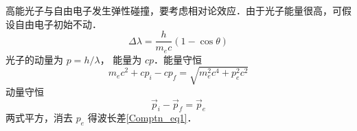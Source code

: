 

高能光子与自由电子发生弹性碰撞，要考虑相对论效应．由于光子能量很高，可假设自由电子初始不动．
\begin{equation}\label{Comptn_eq1}
\Delta \lambda  = \frac{h}{m_e c}(1 - \cos\theta )
\end{equation}
光子的动量为 $p = h/\lambda$， 能量为 $cp$．能量守恒
\begin{equation}
m_e c^2 + c p_i - c p_f = \sqrt{m_e^2 c^4 + p_e^2 c^2}
\end{equation}
动量守恒
\begin{equation}
\vec p_i - \vec p_f = \vec p_e
\end{equation}
两式平方，消去 $p_e$ 得波长差\autoref{Comptn_eq1}．
